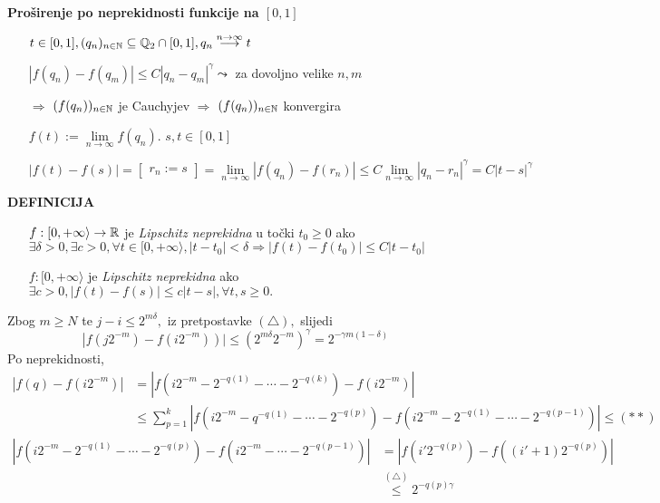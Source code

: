 \documentclass{article}
\begin{document}
\textbf{Proširenje po neprekidnosti funkcije na \([0,1]\)}
\begin{enumerate}
    \item[\ding{113}] \(t\in[0,1],(q_n)_{n\in\Bbb N}\subseteq\Bbb Q_2\cap[0,1],q_n\overset{n\to\infty}{\longrightarrow}t\)
    \item[\ding{113}] \(|f(q_n)-f(q_m)|\le C|q_n-q_m|^\gamma\leadsto\) za dovoljno velike \(n,m\)
    \item[\(\Rightarrow\)] \((f(q_n))_{n\in\Bbb N}\) je Cauchyjev \(\Rightarrow\) \((f(q_n))_{n\in\Bbb N}\) konvergira
    \item[\ding{113}] \(f(t):=\lim\limits_{n\to\infty}f(q_n).\) \(s,t\in[0,1]\)
    \item[] \(|f(t)-f(s)|=\begin{bmatrix}r_n:=s\end{bmatrix}=\lim\limits_{n\to\infty}|f(q_n)-f(r_n)|\le C\lim\limits_{n\to\infty}|q_n-r_n|^\gamma=C|t-s|^\gamma\)
\end{enumerate}
\textbf{DEFINICIJA}\begin{enumerate}
    \item[\ding{113}] \(f:[0,+\infty\rangle\to\Bbb R\) je \emph{Lipschitz neprekidna} u točki \(t_0\ge0\) ako \(\exists\delta>0,\exists c>0,\forall t\in[0,+\infty\rangle,|t-t_0|<\delta\Rightarrow|f(t)-f(t_0)|\le C|t-t_0|\)
    \item[\ding{113}] \(f:[0,+\infty\rangle\) je \emph{Lipschitz neprekidna} ako  \(\exists c>0,|f(t)-f(s)|\le c|t-s|,\forall t,s\ge0.\) 
\end{enumerate}
Zbog \(m\ge N\) te \(j-i\le 2^{m\delta},\) iz pretpostavke \((\triangle),\) slijedi \[\left|f\left(j2^{-m}\right)-f\left(i2^{-m}\right)\right)|\le\left(2^{m\delta}2^{-m}\right)^\gamma=2^{-\gamma m(1-\delta)}\]
Po neprekidnosti, \[\begin{aligned}\left|f(q)-f\left(i2^{-m}\right)\right|&=\left|f\left(i2^{-m}-2^{-q(1)}-\cdots-2^{-q(k)}\right)-f\left(i2^{-m}\right)\right|\\&\le\sum_{p=1}^k\left|f\left(i2^{-m}-q^{-q(1)}-\cdots-2^{-q(p)}\right)-f\left(i2^{-m}-2^{-q(1)}-\cdots-2^{-q(p-1)}\right)\right|\le(\ast\ast)\end{aligned}\]\[\begin{aligned}\left|f\left(i2^{-m}-2^{-q(1)}-\cdots-2^{-q(p)}\right)-f\left(i2^{-m}-\cdots-2^{-q(p-1)}\right)\right|&=\left|f\left(i'2^{-q(p)}\right)-f\left((i'+1)2^{-q(p)}\right)\right|\\&\overset{(\triangle)}{\le}2^{-q(p)\gamma}\end{aligned}\]
\end{document}
